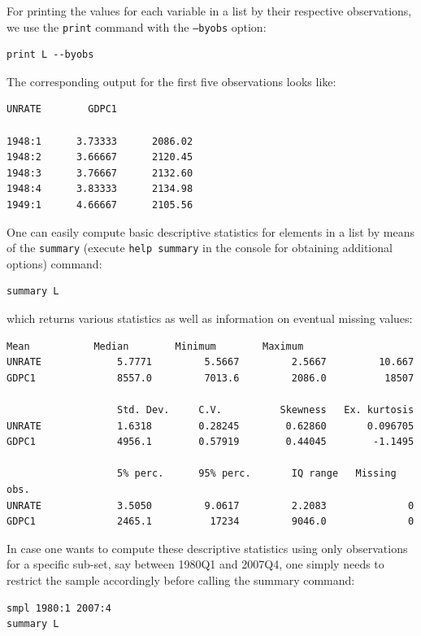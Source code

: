 \documentclass[11pt]{article}
\begin{document}
For printing the values for each variable in a list by their respective observations, we use the \texttt{print} command with the \texttt{---byobs} option:
\begin{Verbatim}[baselinestretch=0.75, fontsize=\small]
print L --byobs
\end{Verbatim}
The corresponding output for the first five observations looks like:
\begin{Verbatim}[baselinestretch=0.75, fontsize=\small]
             UNRATE        GDPC1

1948:1      3.73333      2086.02
1948:2      3.66667      2120.45
1948:3      3.76667      2132.60
1948:4      3.83333      2134.98
1949:1      4.66667      2105.56
\end{Verbatim}

One can easily compute basic descriptive statistics for elements in a list by means of the \texttt{summary} (execute \texttt{help summary} in the console for obtaining additional options) command:
\begin{Verbatim}[baselinestretch=0.75, fontsize=\small]
summary L
\end{Verbatim}
which returns various statistics as well as information on eventual missing values:
\begin{Verbatim}[baselinestretch=0.75, fontsize=\small]
                   Mean           Median        Minimum        Maximum
UNRATE             5.7771         5.5667         2.5667         10.667
GDPC1              8557.0         7013.6         2086.0          18507

                   Std. Dev.     C.V.          Skewness   Ex. kurtosis
UNRATE             1.6318        0.28245        0.62860       0.096705
GDPC1              4956.1        0.57919        0.44045        -1.1495

                   5% perc.      95% perc.       IQ range   Missing obs.
UNRATE             3.5050         9.0617         2.2083              0
GDPC1              2465.1          17234         9046.0              0
\end{Verbatim}

In case one wants to compute these descriptive statistics using only observations for a specific sub-set, say between 1980Q1 and 2007Q4, one simply needs to restrict the sample accordingly before calling the summary command:
\begin{Verbatim}[baselinestretch=0.75, fontsize=\small]
smpl 1980:1 2007:4
summary L
\end{Verbatim}
\end{document}
